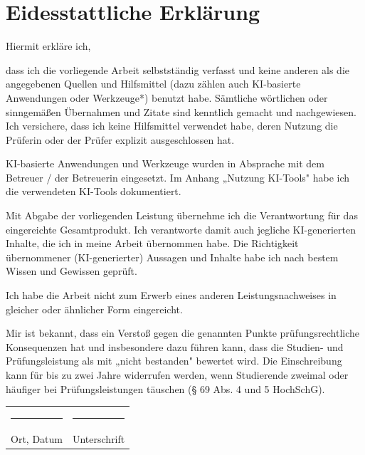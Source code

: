 
\chapter*{Eidesstattliche Erklärung}

\noindent Hiermit erkläre ich,

\medskip\noindent
dass ich die vorliegende Arbeit selbstständig verfasst und keine anderen als die angegebenen
Quellen und Hilfsmittel (dazu zählen auch KI-basierte Anwendungen oder Werkzeuge*) benutzt
habe. Sämtliche wörtlichen oder sinngemäßen Übernahmen und Zitate sind kenntlich gemacht
und nachgewiesen. Ich versichere, dass ich keine Hilfsmittel verwendet habe, deren Nutzung
die Prüferin oder der Prüfer explizit ausgeschlossen hat.

\medskip\noindent
KI-basierte Anwendungen und Werkzeuge wurden in Absprache mit dem Betreuer / der Betreuerin
eingesetzt. Im Anhang „Nutzung KI-Tools" habe ich die verwendeten KI-Tools dokumentiert.

\medskip\noindent
Mit Abgabe der vorliegenden Leistung übernehme ich die Verantwortung für das eingereichte
Gesamtprodukt. Ich verantworte damit auch jegliche KI-generierten Inhalte, die ich in meine
Arbeit übernommen habe. Die Richtigkeit übernommener (KI-generierter) Aussagen und
Inhalte habe ich nach bestem Wissen und Gewissen geprüft.

\medskip\noindent
Ich habe die Arbeit nicht zum Erwerb eines anderen Leistungsnachweises in gleicher oder
ähnlicher Form eingereicht.

\medskip\noindent
Mir ist bekannt, dass ein Verstoß gegen die genannten Punkte prüfungsrechtliche
Konsequenzen hat und insbesondere dazu führen kann, dass die Studien- und Prüfungsleistung
als mit „nicht bestanden" bewertet wird. Die Einschreibung kann für bis zu zwei Jahre
widerrufen werden, wenn Studierende zweimal oder häufiger bei Prüfungsleistungen täuschen
(§ 69 Abs. 4 und 5 HochSchG).

\vspace{1.5cm}

\noindent
\begin{tabular}{@{}p{7cm}p{7cm}@{}}
    \rule{6cm}{0.5pt} & \rule{6cm}{0.5pt} \\
    Ort, Datum & Unterschrift \\
\end{tabular}

\vspace{1.5cm}
